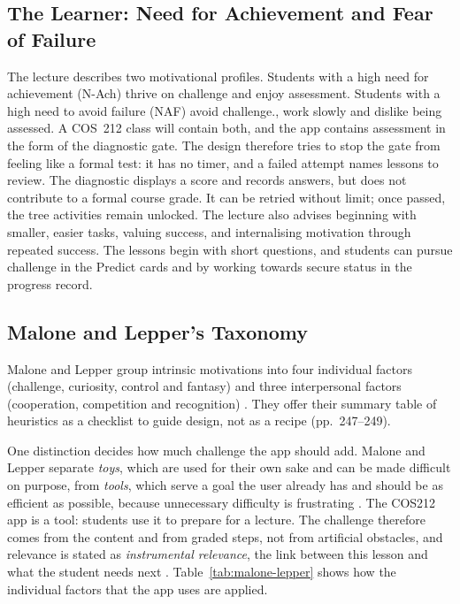 \subsection{The Learner: Need for Achievement and Fear of Failure}
The lecture describes two motivational profiles. Students with a high need for achievement (N-Ach) \cite{McClelland1961} thrive on challenge and enjoy assessment. Students with a high need to avoid failure (NAF) avoid challenge\cite{Atkinson1957}., work slowly and dislike being assessed. A COS~212 class will contain both, and the app contains assessment in the form of the diagnostic gate. The design therefore tries to stop the gate from feeling like a formal test: it has no timer, and a failed attempt names lessons to review. The diagnostic displays a score and records answers, but does not contribute to a formal course grade. It can be retried without limit; once passed, the tree activities remain unlocked. The lecture also advises beginning with smaller, easier tasks, valuing success, and internalising motivation through repeated success. The lessons begin with short questions, and students can pursue challenge in the Predict cards and by working towards secure status in the progress record.

\subsection{Malone and Lepper's Taxonomy}
Malone and Lepper group intrinsic motivations into four individual factors (challenge, curiosity, control and fantasy) and three interpersonal factors (cooperation, competition and recognition) \cite{Malone1987}. They offer their summary table of heuristics as a checklist to guide design, not as a recipe (pp.~247--249).

One distinction decides how much challenge the app should add. Malone and Lepper separate \emph{toys}, which are used for their own sake and can be made difficult on purpose, from \emph{tools}, which serve a goal the user already has and should be as efficient as possible, because unnecessary difficulty is frustrating \cite[pp.~234--235]{Malone1987}. The COS212 app is a tool: students use it to prepare for a lecture. The challenge therefore comes from the content and from graded steps, not from artificial obstacles, and relevance is stated as \emph{instrumental relevance}, the link between this lesson and what the student needs next \cite[p.~233]{Malone1987}. Table~\ref{tab:malone-lepper} shows how the individual factors that the app uses are applied.

